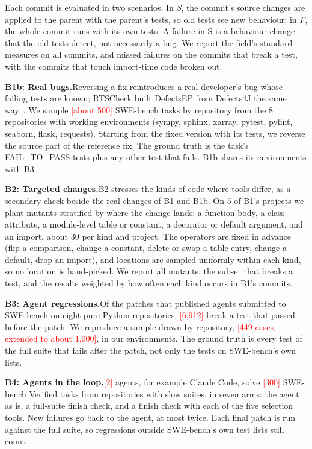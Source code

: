 \documentclass[acmsmall,screen,review,anonymous]{acmart}
\newcommand{\ph}[1]{\textcolor{red}{[#1]}}
\newcommand{\para}[1]{\smallskip\noindent\textbf{#1}\hspace{0.4em}}
\begin{document}
Each commit is evaluated in two scenarios. In \emph{S}, the commit's source changes are applied to the parent with the parent's tests, so old tests see new behaviour; in \emph{F}, the whole commit runs with its own tests. A failure in S is a behaviour change that the old tests detect, not necessarily a bug. We report the field's standard measures on all commits, and missed failures on the commits that break a test, with the commits that touch import-time code broken out.

\para{B1b: Real bugs.}Reversing a fix reintroduces a real developer's bug whose failing tests are known; RTSCheck built DefectsEP from Defects4J the same way~\cite{zhu2019rtscheck}. We sample \ph{about 500} SWE-bench tasks by repository from the 8 repositories with working environments (sympy, sphinx, xarray, pytest, pylint, seaborn, flask, requests). Starting from the fixed version with its tests, we reverse the source part of the reference fix. The ground truth is the task's FAIL\_TO\_PASS tests plus any other test that fails. B1b shares its environments with B3.

\para{B2: Targeted changes.}B2 stresses the kinds of code where tools differ, as a secondary check beside the real changes of B1 and B1b. On 5 of B1's projects we plant mutants stratified by where the change lands: a function body, a class attribute, a module-level table or constant, a decorator or default argument, and an import, about 30 per kind and project. The operators are fixed in advance (flip a comparison, change a constant, delete or swap a table entry, change a default, drop an import), and locations are sampled uniformly within each kind, so no location is hand-picked. We report all mutants, the subset that breaks a test, and the results weighted by how often each kind occurs in B1's commits.

\para{B3: Agent regressions.}Of the patches that published agents submitted to SWE-bench on eight pure-Python repositories, \ph{6,912} break a test that passed before the patch. We reproduce a sample drawn by repository, \ph{449 cases, extended to about 1,000}, in our environments. The ground truth is every test of the full suite that fails after the patch, not only the tests on SWE-bench's own lists.

\para{B4: Agents in the loop.}\ph{2} agents, for example Claude Code, solve \ph{300} SWE-bench Verified tasks from repositories with slow suites, in seven arms: the agent as is, a full-suite finish check, and a finish check with each of the five selection tools. New failures go back to the agent, at most twice. Each final patch is run against the full suite, so regressions outside SWE-bench's own test lists still count.
\end{document}
